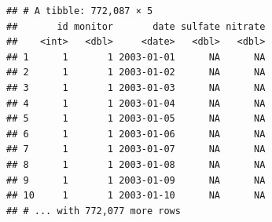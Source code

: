 \documentclass[]{article}
\begin{document}
\begin{verbatim}
## # A tibble: 772,087 × 5
##       id monitor       date sulfate nitrate
##    <int>   <dbl>     <date>   <dbl>   <dbl>
## 1      1       1 2003-01-01      NA      NA
## 2      1       1 2003-01-02      NA      NA
## 3      1       1 2003-01-03      NA      NA
## 4      1       1 2003-01-04      NA      NA
## 5      1       1 2003-01-05      NA      NA
## 6      1       1 2003-01-06      NA      NA
## 7      1       1 2003-01-07      NA      NA
## 8      1       1 2003-01-08      NA      NA
## 9      1       1 2003-01-09      NA      NA
## 10     1       1 2003-01-10      NA      NA
## # ... with 772,077 more rows
\end{verbatim}
\end{document}

